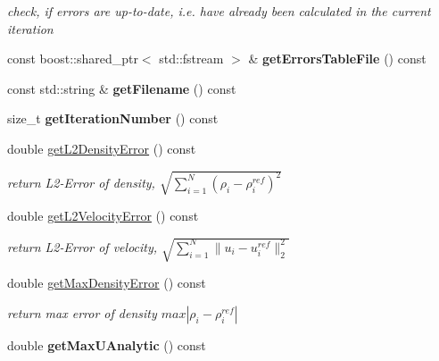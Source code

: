 \begin{DoxyCompactItemize}
\begin{DoxyCompactList}\small\item\em check, if errors are up-\/to-\/date, i.e. have already been calculated in the current iteration \item\end{DoxyCompactList}\item 
\hypertarget{classnatrium_1_1ErrorStats_a87398bf4e64d3ed9c9602235c0a0674f}{
const boost::shared\_\-ptr$<$ std::fstream $>$ \& {\bfseries getErrorsTableFile} () const }
\label{classnatrium_1_1ErrorStats_a87398bf4e64d3ed9c9602235c0a0674f}

\item 
\hypertarget{classnatrium_1_1ErrorStats_a341ef071a84aa3a2b78485ce90bca7b2}{
const std::string \& {\bfseries getFilename} () const }
\label{classnatrium_1_1ErrorStats_a341ef071a84aa3a2b78485ce90bca7b2}

\item 
\hypertarget{classnatrium_1_1ErrorStats_ab710182a15d0c548fbc8c3b071dbebd1}{
size\_\-t {\bfseries getIterationNumber} () const }
\label{classnatrium_1_1ErrorStats_ab710182a15d0c548fbc8c3b071dbebd1}

\item 
double \hyperlink{classnatrium_1_1ErrorStats_a66f817c7daaf15724d5d42de4f17a1e8}{getL2DensityError} () const 
\begin{DoxyCompactList}\small\item\em return L2-\/Error of density, $ \sqrt{ \sum_{i=1}^{N} (\rho_{i} - \rho_{i}^{ref})^{2} } $ \item\end{DoxyCompactList}\item 
double \hyperlink{classnatrium_1_1ErrorStats_a201f625a3607a814fdd645aabfe37fbc}{getL2VelocityError} () const 
\begin{DoxyCompactList}\small\item\em return L2-\/Error of velocity, $ \sqrt{ \sum_{i=1}^{N} \|u_{i} - u_{i}^{ref}\|_{2}^{2} } $ \item\end{DoxyCompactList}\item 
\hypertarget{classnatrium_1_1ErrorStats_a8e32b3e8c8d141b6cdcf5428613a875e}{
double \hyperlink{classnatrium_1_1ErrorStats_a8e32b3e8c8d141b6cdcf5428613a875e}{getMaxDensityError} () const }
\label{classnatrium_1_1ErrorStats_a8e32b3e8c8d141b6cdcf5428613a875e}

\begin{DoxyCompactList}\small\item\em return max error of density $ max | \rho_{i} - \rho_{i}^{ref} | $ \item\end{DoxyCompactList}\item 
\hypertarget{classnatrium_1_1ErrorStats_a350f6b6fcc91f18006095331b0aa430c}{
double {\bfseries getMaxUAnalytic} () const }
\label{classnatrium_1_1ErrorStats_a350f6b6fcc91f18006095331b0aa430c}


\end{DoxyCompactItemize}
